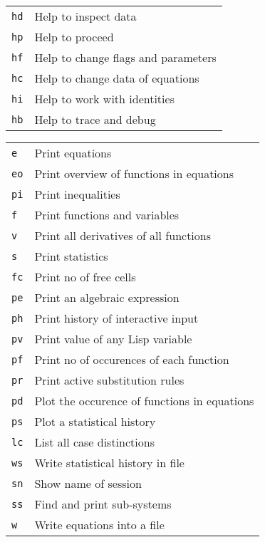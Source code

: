 
\begin{longtable}[l]{ll}
  \texttt{hd} & Help to inspect data \\
  \texttt{hp} & Help to proceed \\
  \texttt{hf} & Help to change flags and parameters \\
  \texttt{hc} & Help to change data of equations \\
  \texttt{hi} & Help to work with identities \\
  \texttt{hb} & Help to trace and debug
\end{longtable}


\begin{longtable}[l]{ll}
  \texttt{e}  & Print equations \\
  \texttt{eo} & Print overview of functions in equations \\
  \texttt{pi} & Print inequalities \\
  \texttt{f}  & Print functions and variables \\
  \texttt{v}  & Print all derivatives of all functions \\
  \texttt{s}  & Print statistics \\
  \texttt{fc} & Print no of free cells \\
  \texttt{pe} & Print an algebraic expression \\
  \texttt{ph} & Print history of interactive input \\
  \texttt{pv} & Print value of any Lisp variable \\
  \texttt{pf} & Print no of occurences of each function \\
  \texttt{pr} & Print active substitution rules \\
  \texttt{pd} & Plot the occurence of functions in equations \\
  \texttt{ps} & Plot a statistical history \\
  \texttt{lc} & List all case distinctions \\
  \texttt{ws} & Write statistical history in file \\
  \texttt{sn} & Show name of session \\
  \texttt{ss} & Find and print sub-systems \\
  \texttt{w}  & Write equations into a file
\end{longtable}


